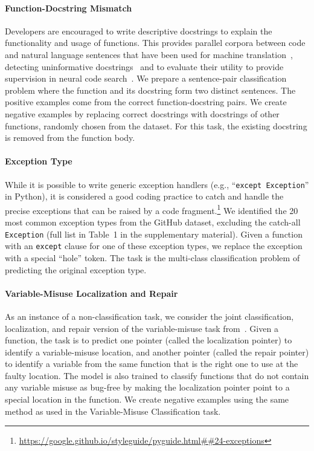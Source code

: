 \documentclass{article}
\newcommand{\update}[1]{#1}
\begin{document}
\paragraph{Function-Docstring Mismatch}
Developers are encouraged to write descriptive docstrings to explain the functionality and usage of functions. This provides parallel corpora between code and natural language sentences that have been used for machine translation~\citep{barone2017parallel}, detecting uninformative docstrings~\citep{louis2018deep} and to evaluate their utility to provide supervision in neural code search~\citep{cambronero2019deep}. We prepare a sentence-pair classification problem where the function and its docstring form two distinct sentences. The positive examples come from the correct function-docstring pairs. We create negative examples by replacing correct docstrings with docstrings of other functions, randomly chosen from the dataset. For this task, the existing docstring is removed from the function body. 

\paragraph{Exception Type}
While it is possible to write generic exception handlers (e.g., ``\texttt{except Exception}'' in Python), it is considered a good coding practice to catch and handle the precise exceptions that can be raised by a code fragment.\footnote{\url{https://google.github.io/styleguide/pyguide.html##24-exceptions}} We identified the 20 most common exception types from the GitHub dataset, excluding the catch-all \texttt{Exception} (\update{full list in Table~1 in the supplementary material}). Given a function with an \texttt{except} clause for one of these exception types, we replace the exception with a special ``hole'' token. The task is the multi-class classification problem of predicting the original exception type.

\paragraph{{Variable-Misuse Localization and Repair}}
As an instance of a non-classification task, we consider the joint classification, localization, and repair version of the variable-misuse task from~\citet{DBLP:journals/corr/abs-1904-01720}. Given a function, the task is to predict one pointer (called the localization pointer) to identify a variable-misuse location, and another pointer (called the repair pointer) to identify a variable from the same function that is the right one to use at the faulty location. The model is also trained to classify functions that do not contain any variable misuse as bug-free by making the localization pointer point to a special location in the function. We create negative examples using the same method as used in the Variable-Misuse Classification task.
\end{document}
